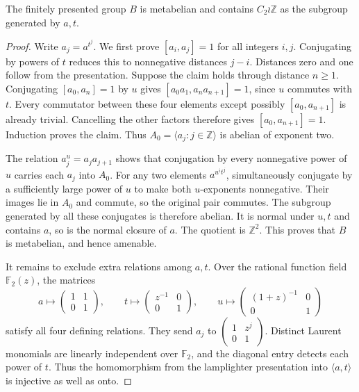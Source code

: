 \documentclass[11pt,a4paper]{article}
\numberwithin{equation}{section}
\newcommand{\ZZ}{\mathbb Z}
\begin{document}
\begin{lemma}\label{lem:metabelian-stabilizer}
The finitely presented group $B$ is metabelian and contains
$C_2\wr\ZZ$ as the subgroup generated by $a,t$.
\end{lemma}
\begin{proof}
Write $a_j=a^{t^j}$. We first prove $[a_i,a_j]=1$ for all integers
$i,j$. Conjugating by powers of $t$ reduces this to nonnegative
distances $j-i$. Distances zero and one follow from the presentation.
Suppose the claim holds through distance $n\geq1$. Conjugating
$[a_0,a_n]=1$ by $u$ gives
$[a_0a_1,a_na_{n+1}]=1$, since $u$ commutes with $t$.
Every commutator between these four elements except possibly
$[a_0,a_{n+1}]$ is already trivial. Cancelling the other factors
therefore gives $[a_0,a_{n+1}]=1$. Induction proves the claim.
Thus $A_0=\langle a_j:j\in\ZZ\rangle$ is abelian of exponent two.

The relation $a_j^u=a_ja_{j+1}$ shows that conjugation by every
nonnegative power of $u$ carries each $a_j$ into $A_0$.
For any two elements $a^{u^i t^j}$, simultaneously conjugate by a
sufficiently large power of $u$ to make both $u$-exponents
nonnegative. Their images lie in $A_0$ and commute, so the original
pair commutes. The subgroup generated by all these conjugates is
therefore abelian. It is normal under $u,t$ and contains $a$,
so is the normal closure of $a$. The quotient is $\ZZ^2$.
This proves that $B$ is metabelian, and hence amenable.

It remains to exclude extra relations among $a,t$. Over the rational
function field $\mathbb F_2(z)$, the matrices
\[
 a\longmapsto\begin{pmatrix}1&1\\0&1\end{pmatrix},\qquad
 t\longmapsto\begin{pmatrix}z^{-1}&0\\0&1\end{pmatrix},\qquad
 u\longmapsto\begin{pmatrix}(1+z)^{-1}&0\\0&1\end{pmatrix}
\]
satisfy all four defining relations. They send $a_j$ to
$\left(\begin{smallmatrix}1&z^j\\0&1\end{smallmatrix}\right)$.
Distinct Laurent monomials are linearly independent over
$\mathbb F_2$, and the diagonal entry detects each power of $t$.
Thus the homomorphism from the lamplighter presentation into
$\langle a,t\rangle$ is injective as well as onto.
\end{proof}
\end{document}

